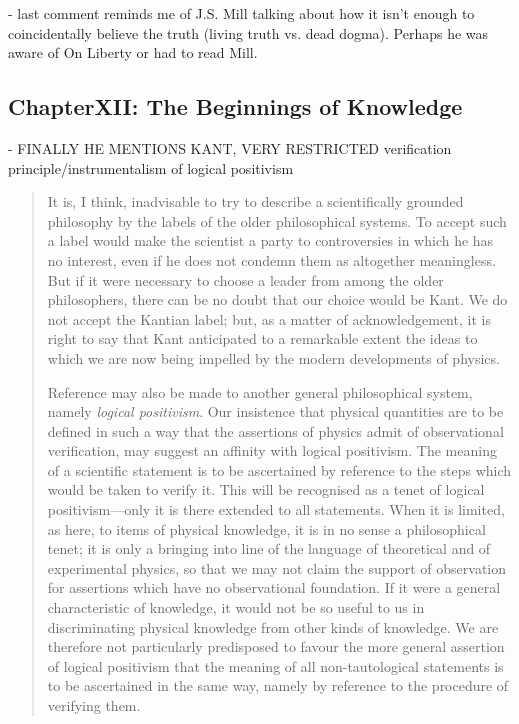- last comment reminds me of J.S. Mill talking about how it isn't enough to coincidentally believe the truth (living truth vs. dead dogma).  Perhaps he was aware of On Liberty or had to read Mill.


\subsection{ChapterXII: The Beginnings of Knowledge}

- FINALLY HE MENTIONS KANT, VERY RESTRICTED verification principle/instrumentalism of logical positivism

\begin{quote}
    It is, I think, inadvisable to try to describe a scientifically grounded philosophy by the labels of the older philosophical systems.  To accept such a label would make the scientist a party to controversies in which he has no interest, even if he does not condemn them as altogether meaningless.  But if it were necessary to choose a leader from among the older philosophers, there can be no doubt that our choice would be Kant.  We do not accept the Kantian label; but, as a matter of acknowledgement, it is right to say that Kant anticipated to a remarkable extent the ideas to which we are now being impelled by the modern developments of physics.  

    Reference may also be made to another general philosophical system, namely \emph{logical positivism}.  Our insistence that physical quantities are to be defined in such a way that the assertions of physics admit of observational verification, may suggest an affinity with logical positivism.  The meaning of a scientific statement is to be ascertained by reference to the steps which would be taken to verify it.  This will be recognised as a tenet of logical positivism---only it is there extended to all statements.  When it is limited, as here, to items of physical knowledge, it is in no sense a philosophical tenet; it is only a bringing into line of the language of theoretical and of experimental physics, so that we may not claim the support of observation for assertions which have no observational foundation.  If it were a general characteristic of knowledge, it would not be so useful to us in discriminating physical knowledge from other kinds of knowledge.  We are therefore not particularly predisposed to favour the more general assertion of logical positivism that the meaning of all non-tautological statements is to be ascertained in the same way, namely by reference to the procedure of verifying them.  \citep[p. 188-189]{Eddington1939}
\end{quote}


